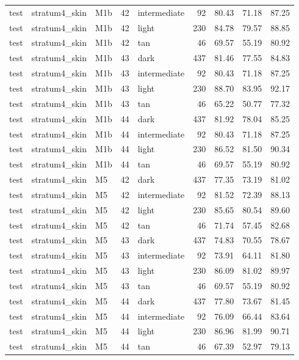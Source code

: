 \begin{tabular}{lllrlrrrr}
test & stratum4\_skin & M1b & 42 & intermediate & 92 & 80.43 & 71.18 & 87.25 \\
test & stratum4\_skin & M1b & 42 & light & 230 & 84.78 & 79.57 & 88.85 \\
test & stratum4\_skin & M1b & 42 & tan & 46 & 69.57 & 55.19 & 80.92 \\
test & stratum4\_skin & M1b & 43 & dark & 437 & 81.46 & 77.55 & 84.83 \\
test & stratum4\_skin & M1b & 43 & intermediate & 92 & 80.43 & 71.18 & 87.25 \\
test & stratum4\_skin & M1b & 43 & light & 230 & 88.70 & 83.95 & 92.17 \\
test & stratum4\_skin & M1b & 43 & tan & 46 & 65.22 & 50.77 & 77.32 \\
test & stratum4\_skin & M1b & 44 & dark & 437 & 81.92 & 78.04 & 85.25 \\
test & stratum4\_skin & M1b & 44 & intermediate & 92 & 80.43 & 71.18 & 87.25 \\
test & stratum4\_skin & M1b & 44 & light & 230 & 86.52 & 81.50 & 90.34 \\
test & stratum4\_skin & M1b & 44 & tan & 46 & 69.57 & 55.19 & 80.92 \\
test & stratum4\_skin & M5 & 42 & dark & 437 & 77.35 & 73.19 & 81.02 \\
test & stratum4\_skin & M5 & 42 & intermediate & 92 & 81.52 & 72.39 & 88.13 \\
test & stratum4\_skin & M5 & 42 & light & 230 & 85.65 & 80.54 & 89.60 \\
test & stratum4\_skin & M5 & 42 & tan & 46 & 71.74 & 57.45 & 82.68 \\
test & stratum4\_skin & M5 & 43 & dark & 437 & 74.83 & 70.55 & 78.67 \\
test & stratum4\_skin & M5 & 43 & intermediate & 92 & 73.91 & 64.11 & 81.80 \\
test & stratum4\_skin & M5 & 43 & light & 230 & 86.09 & 81.02 & 89.97 \\
test & stratum4\_skin & M5 & 43 & tan & 46 & 69.57 & 55.19 & 80.92 \\
test & stratum4\_skin & M5 & 44 & dark & 437 & 77.80 & 73.67 & 81.45 \\
test & stratum4\_skin & M5 & 44 & intermediate & 92 & 76.09 & 66.44 & 83.64 \\
test & stratum4\_skin & M5 & 44 & light & 230 & 86.96 & 81.99 & 90.71 \\
test & stratum4\_skin & M5 & 44 & tan & 46 & 67.39 & 52.97 & 79.13 \\

\end{tabular}
